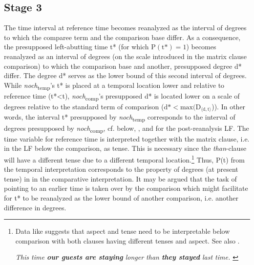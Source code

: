\documentclass[output=paper]{langsci/langscibook}
\begin{document}
\subsection{Stage 3} The time interval at reference time becomes reanalyzed as the interval of degrees to which the comparee term and the comparison base differ. As a consequence, the presupposed left-abutting time t* (for which $\text{P}(\text{t*})=1$) becomes reanalyzed as an interval of degrees (on the scale introduced in the matrix clause comparison) to which the comparison base and another, presupposed degree d* differ. The degree d* serves as the lower bound of this second interval of degrees. While \textit{noch}\textsubscript{temp}'s t* is placed at a temporal location lower and relative to reference time (t*<t), \textit{noch}\textsubscript{comp}'s presupposed d* is located lower on a scale of degrees relative to the standard term of comparison ($\text{d*}<\text{max}(\text{D}_{\langle \text{d},\text{t}\rangle}$)). In other words, the interval t* presupposed by \textit{noch}\textsubscript{temp} corresponds to the interval of degrees presupposed by \textit{noch}\textsubscript{comp}, cf. below, , and  for the post-reanalysis LF. The time variable for reference time is interpreted together with the matrix clause, i.e. in the LF below the comparison, as tense. This is necessary since the \textit{than}-clause will have a different tense due to a different temporal location.\footnote{Data like  suggests that aspect and tense need to be interpretable below comparison with both clauses having different tenses and aspect. See also \citep{stechow2006}.

\ea \itshape This time \textbf{our guests are staying} longer than \textbf{they stayed} last time. \label{tense_and_aspect_example}\z} Thus, P(t) from the temporal interpretation corresponds to the property of degrees (at present tense) in  in the comparative interpretation.
It may be argued that the task of pointing to an earlier time is taken over by the comparison which might facilitate for t* to be reanalyzed as the lower bound of another comparison, i.e. another difference in degrees.
\end{document}
